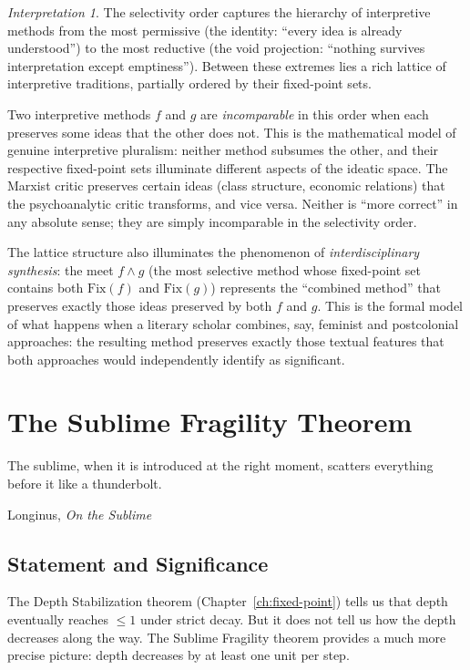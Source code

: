 \documentclass[11pt,openany]{book}
\theoremstyle{definition}
\theoremstyle{plain}
\theoremstyle{remark}
\newtheorem{interpretation}[axiom]{Interpretation}
\begin{document}
\begin{interpretation}
The selectivity order captures the hierarchy of interpretive methods from the most permissive (the identity: ``every idea is already understood'') to the most reductive (the void projection: ``nothing survives interpretation except emptiness''). Between these extremes lies a rich lattice of interpretive traditions, partially ordered by their fixed-point sets.

Two interpretive methods $f$ and $g$ are \emph{incomparable} in this order when each preserves some ideas that the other does not. This is the mathematical model of genuine interpretive pluralism: neither method subsumes the other, and their respective fixed-point sets illuminate different aspects of the ideatic space. The Marxist critic preserves certain ideas (class structure, economic relations) that the psychoanalytic critic transforms, and vice versa. Neither is ``more correct'' in any absolute sense; they are simply incomparable in the selectivity order.

The lattice structure also illuminates the phenomenon of \emph{interdisciplinary synthesis}: the meet $f \wedge g$ (the most selective method whose fixed-point set contains both $\mathrm{Fix}(f)$ and $\mathrm{Fix}(g)$) represents the ``combined method'' that preserves exactly those ideas preserved by both $f$ and $g$. This is the formal model of what happens when a literary scholar combines, say, feminist and postcolonial approaches: the resulting method preserves exactly those textual features that both approaches would independently identify as significant.
\end{interpretation}

\chapter{The Sublime Fragility Theorem}
\label{ch:sublime}

\epigraph{The sublime, when it is introduced at the right moment, scatters everything before it like a thunderbolt.}{Longinus, \textit{On the Sublime}}

\section{Statement and Significance}

The Depth Stabilization theorem (Chapter~\ref{ch:fixed-point}) tells us that depth eventually reaches $\leq 1$ under strict decay. But it does not tell us how the depth decreases along the way. The Sublime Fragility theorem provides a much more precise picture: depth decreases by at least one unit per step.
\end{document}
